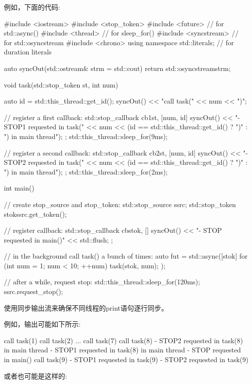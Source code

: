 例如，下面的代码:


\begin{cpp}
#include <iostream>
#include <stop_token>
#include <future> // for std::async()
#include <thread> // for sleep_for()
#include <syncstream> // for std::osyncstream
#include <chrono>
using namespace std::literals; // for duration literals

auto syncOut(std::ostream& strm = std::cout) {
	return std::osyncstream{strm};
}

void task(std::stop_token st, int num)
{
	auto id = std::this_thread::get_id();
	syncOut() << "call task(" << num << ")\n";

	// register a first callback:
	std::stop_callback cb1{st, [num, id]{
		syncOut() << "- STOP1 requested in task(" << num
			<< (id == std::this_thread::get_id() ? ")\n"
												: ") in main thread\n");
	}};
	std::this_thread::sleep_for(9ms);

	// register a second callback:
	std::stop_callback cb2{st, [num, id]{
		syncOut() << "- STOP2 requested in task(" << num
			<< (id == std::this_thread::get_id() ? ")\n"
												: ") in main thread\n");
	}};
	std::this_thread::sleep_for(2ms);
}

int main()
{
	// create stop_source and stop_token:
	std::stop_source ssrc;
	std::stop_token stok{ssrc.get_token()};

	// register callback:
	std::stop_callback cb{stok, []{
			syncOut() << "- STOP requested in main()\n" << std::flush;
	}};

	// in the background call task() a bunch of times:
	auto fut = std::async([stok] {
							for (int num = 1; num < 10; ++num) {
								task(stok, num);
							}
						});

	// after a while, request stop:
	std::this_thread::sleep_for(120ms);
	ssrc.request_stop();
}
\end{cpp}

使用同步输出流来确保不同线程的print语句逐行同步。

例如，输出可能如下所示:

\begin{shell}
call task(1)
call task(2)
...
call task(7)
call task(8)
- STOP2 requested in task(8) in main thread
- STOP1 requested in task(8) in main thread
- STOP requested in main()
call task(9)
- STOP1 requested in task(9)
- STOP2 requested in task(9)
\end{shell}


或者也可能是这样的:

